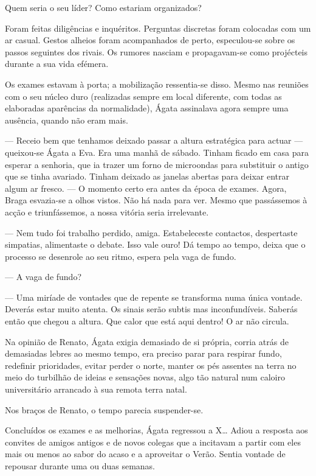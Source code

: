 Quem seria o seu líder? Como estariam organizados?

Foram feitas diligências e inquéritos. Perguntas discretas foram
colocadas com um ar casual. Gestos alheios foram acompanhados de
perto, especulou-se sobre os passos seguintes dos rivais. Os rumores
nasciam e propagavam-se como projécteis durante a sua vida efémera.

Os exames estavam à porta; a mobilização ressentia-se disso. Mesmo nas
reuniões com o seu núcleo duro (realizadas sempre em local diferente,
com todas as elaboradas aparências da normalidade), Ágata assinalava
agora sempre uma ausência, quando não eram mais.

--- Receio bem que tenhamos deixado passar a altura estratégica para
  actuar --- queixou-se Ágata a Eva. Era uma manhã de sábado. Tinham
  ficado em casa para esperar a senhoria, que ia trazer um forno de
  microondas para substituir o antigo que se tinha avariado. Tinham
  deixado as janelas abertas para deixar entrar algum ar fresco. --- O
  momento certo era antes da época de exames. Agora, Braga esvazia-se a
  olhos vistos. Não há nada para ver. Mesmo que passássemos à acção e
  triunfássemos, a nossa vitória seria irrelevante.

--- Nem tudo foi trabalho perdido, amiga. Estabeleceste contactos,
  despertaste simpatias, alimentaste o debate. Isso vale ouro! Dá tempo
  ao tempo, deixa que o processo se desenrole ao seu ritmo, espera
  pela vaga de fundo.

--- A vaga de fundo?

--- Uma miríade de vontades que de repente se transforma numa única
  vontade. Deverás estar muito atenta. Os sinais serão subtis mas
  inconfundíveis. Saberás então que chegou a altura. Que calor que está
  aqui dentro! O ar não circula.

Na opinião de Renato, Ágata exigia demasiado de si própria, corria atrás
de demasiadas lebres ao mesmo tempo, era preciso parar para respirar
fundo, redefinir prioridades, evitar perder o norte, manter os pés
assentes na terra no meio do turbilhão de ideias e sensações novas, algo
tão natural num caloiro universitário arrancado à sua remota terra
natal.

Nos braços de Renato, o tempo parecia suspender-se.

Concluídos os exames e as melhorias, Ágata regressou a X\ldots{} Adiou a
resposta aos convites de amigos antigos e de novos colegas que a
incitavam a partir com eles mais ou menos ao sabor do acaso e a
aproveitar o Verão. Sentia vontade de repousar durante uma ou duas
semanas.

